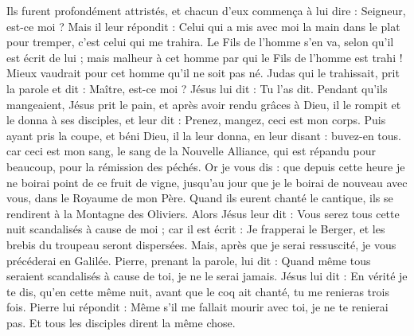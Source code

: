 \begin{multicols}{2}
Ils furent profondément attristés, et chacun d'eux commença à lui dire : Seigneur, est-ce moi ?
Mais il leur répondit : Celui qui a mis avec moi la main dans le plat pour tremper, c'est celui qui me trahira.
Le Fils de l'homme s'en va, selon qu'il est écrit de lui ; mais malheur à cet homme par qui le Fils de l'homme est trahi ! Mieux vaudrait pour cet homme qu'il ne soit pas né.
Judas qui le trahissait, prit la parole et dit : Maître, est-ce moi ? Jésus lui dit : Tu l'as dit.
Pendant qu'ils mangeaient, Jésus prit le pain, et après avoir rendu grâces à Dieu, il le rompit et le donna à ses disciples, et leur dit : Prenez, mangez, ceci est mon corps.
Puis ayant pris la coupe, et béni Dieu, il la leur donna, en leur disant : buvez-en tous.
car ceci est mon sang, le sang de la Nouvelle Alliance, qui est répandu pour beaucoup, pour la rémission des péchés.
Or je vous dis : que depuis cette heure je ne boirai point de ce fruit de vigne, jusqu'au jour que je le boirai de nouveau avec vous, dans le Royaume de mon Père.
Quand ils eurent chanté le cantique, ils se rendirent à la Montagne des Oliviers.
Alors Jésus leur dit : Vous serez tous cette nuit scandalisés à cause de moi ; car il est écrit : Je frapperai le Berger, et les brebis du troupeau seront dispersées.
Mais, après que je serai ressuscité, je vous précéderai en Galilée.
Pierre, prenant la parole, lui dit : Quand même tous seraient scandalisés à cause de toi, je ne le serai jamais.
Jésus lui dit : En vérité je te dis, qu'en cette même nuit, avant que le coq ait chanté, tu me renieras trois fois.
Pierre lui répondit : Même s'il me fallait mourir avec toi, je ne te renierai pas. Et tous les disciples dirent la même chose.

\end{multicols}
